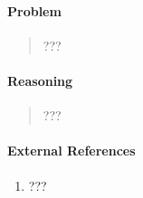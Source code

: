 \documentclass[letterpaper,12pt,twoside]{report}
\begin{document}
	\pagestyle{fancy}
	\fancyhf{}
	
	\paragraph{Problem}
	\begin{quote}
		\textsf{???}
	\end{quote}
	
	\begin{center}
		\begin{tikzpicture}
		\end{tikzpicture}
	\end{center}
	
	\paragraph{Reasoning}
	\begin{quotation}
		
		???
		
	\end{quotation}
	
	\paragraph{External References}
	
	\begin{enumerate}
		\item ???
	\end{enumerate}
	
\end{document}
